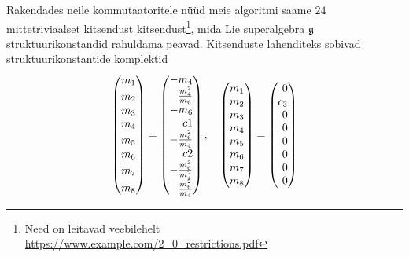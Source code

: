 Rakendades neile kommutaatoritele nüüd meie algoritmi saame $24$
mittetriviaalset kitsendust kitsendust\footnote{Need on leitavad veebilehelt
\url{https://www.example.com/2_0_restrictions.pdf}},
mida Lie superalgebra $\mathfrak{g}$ struktuurikonstandid rahuldama peavad. Kitsenduste
lahenditeks sobivad struktuurikonstantide komplektid
\renewcommand\arraystretch{1.2}
\begin{align*}
    \begin{pmatrix}
        m_1 \\
        m_2 \vphantom{\frac{m_4^2}{m_6}} \\
        m_3 \\
        m_4 \\
        m_5 \vphantom{\frac{m_4^2}{m_6}} \\
        m_6 \\
        m_7 \vphantom{\frac{m_4^2}{m_6}} \\
        m_8 \vphantom{\frac{m_4^2}{m_6}}
    \end{pmatrix}
    =
    \begin{pmatrix*}[r]
        -m_4 \\
        \frac{m_4^2}{m_6} \\
        -m_6 \\
        c1 \\
        -\frac{m_6^2}{m_4} \\
        c2 \\
        -\frac{m_6^3}{m_4^2} \\
        \frac{m_6^2}{m_4}
    \end{pmatrix*},
    \quad
    \begin{pmatrix}
        m_1 \\
        m_2 \\
        m_3 \\
        m_4 \\
        m_5 \\
        m_6 \\
        m_7 \\
        m_8
    \end{pmatrix}
    =
    \begin{pmatrix*}[r]
        0 \\
        c_3 \\
        0 \\
        0 \\
        0 \\
        0 \\
        0 \\
        0

\end{pmatrix*}
\end{align*}
